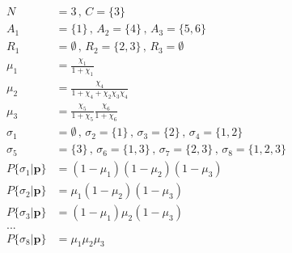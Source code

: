 \begin{subequations}
\begin{align*}
N &= 3
\,,\,
C = \{3\}
\\
A_1 &= \{1\}
\,,\,
A_2 = \{4\}
\,,\,
A_3 = \{5,6\}
\\
R_1 &= \emptyset
\,,\,
R_2 = \{2,3\}
\,,\,
R_3 = \emptyset
\\
\mu_1 &= \frac{\chi_1}{1 + \chi_1}
\\
\mu_2 &= \frac{\chi_4}{1 + \chi_4 + \chi_2 \chi_3 \chi_4}
\\
\mu_3 &= \frac{\chi_5}{1 + \chi_5} \frac{\chi_6}{1 + \chi_6}
\\
\sigma_1 &= \emptyset
\,,\,
\sigma_2 = \{1\}
\,,\,
\sigma_3 = \{2\}
\,,\,
\sigma_4 = \{1,2\}
\\
\sigma_5 &= \{3\}
\,,\,
\sigma_6 = \{1,3\}
\,,\,
\sigma_7 = \{2,3\}
\,,\,
\sigma_8 = \{1,2,3\}
\\
P\{\sigma_1 | \boldsymbol{p}\} &= (1 - \mu_1) (1 - \mu_2) (1 - \mu_3)
\\
P\{\sigma_2 | \boldsymbol{p}\} &= \mu_1 (1 - \mu_2) (1 - \mu_3)
\\
P\{\sigma_3 | \boldsymbol{p}\} &= (1 - \mu_1) \mu_2 (1 - \mu_3)
\\
...
\\
P\{\sigma_8 | \boldsymbol{p}\} &= \mu_1 \mu_2 \mu_3
\end{align*}
\end{subequations}
